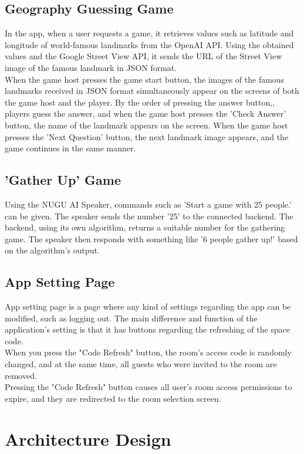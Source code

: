 \documentclass[conference]{IEEEtran}
\begin{document}
        
    \subsection{Geography Guessing Game}
        In the app, when a user requests a game, it retrieves values such as latitude and longitude of world-famous landmarks from the OpenAI API. Using the obtained values and the Google Street View API, it sends the URL of the Street View image of the famous landmark in JSON format.\\
        When the game host presses the game start button, the images of the famous landmarks received in JSON format simultaneously appear on the screens of both the game host and the player. By the order of pressing the answer button,, players guess the answer, and when the game host presses the 'Check Answer' button, the name of the landmark appears on the screen. When the game host presses the 'Next Question' button, the next landmark image appears, and the game continues in the same manner.

    \subsection{'Gather Up' Game}
        Using the NUGU AI Speaker, commands such as 'Start a game with 25 people.' can be given. The speaker sends the number '25' to the connected backend. The backend, using its own algorithm, returns a suitable number for the gathering game. The speaker then responds with something like '6 people gather up!' based on the algorithm's output.
        
    \subsection{App Setting Page}
        App setting page is a page where any kind of settings regarding the app can be modified, such as logging out. The main difference and function of the application’s setting is that it has buttons regarding the refreshing of the space code.\\
        When you press the "Code Refresh" button, the room's access code is randomly changed, and at the same time, all guests who were invited to the room are removed.\\
        Pressing the "Code Refresh" button causes all user's room access permissions to expire, and they are redirected to the room selection screen.

\section{Architecture Design}
\end{document}
